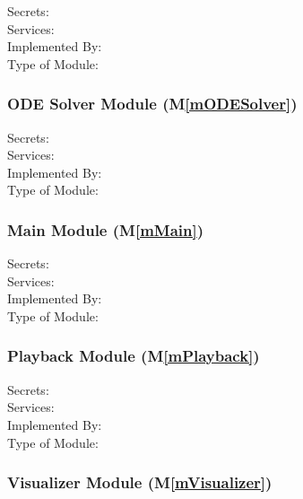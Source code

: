 \documentclass[12pt, titlepage]{article}
\newcommand{\mref}[1]{M\ref{#1}}
\begin{document}
\begin{description}
\item[Secrets:]
\item[Services:]
\item[Implemented By:]
\item[Type of Module:] 
  
\end{description}

\subsubsection{ODE Solver Module (\mref{mODESolver})}

\begin{description}
\item[Secrets:]
\item[Services:]
\item[Implemented By:]
\item[Type of Module:] 
  
\end{description}

\subsubsection{Main Module (\mref{mMain})}

\begin{description}
\item[Secrets:]
\item[Services:]
\item[Implemented By:]
\item[Type of Module:] 
  
\end{description}

\subsubsection{Playback Module (\mref{mPlayback})}

\begin{description}
\item[Secrets:]
\item[Services:]
\item[Implemented By:]
\item[Type of Module:] 
  
\end{description}

\subsubsection{Visualizer Module (\mref{mVisualizer})}
\end{document}
